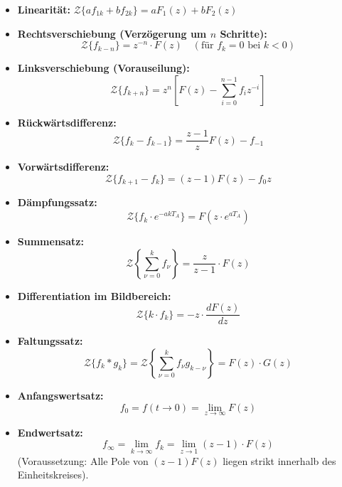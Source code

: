 \begin{tcolorbox}
\small
\begin{itemize}
  \item \textbf{Linearität:} $\mathcal{Z}\{a f_{1k} + b f_{2k}\} = a F_1(z) + b F_2(z)$
  \item \textbf{Rechtsverschiebung (Verzögerung um $n$ Schritte):}
  \[
  \mathcal{Z}\{f_{k-n}\} = z^{-n} \cdot F(z) \quad (\text{für } f_k = 0 \text{ bei } k < 0)
  \]
  \item \textbf{Linksverschiebung (Vorauseilung):}
  \[
  \mathcal{Z}\{f_{k+n}\} = z^n \left[ F(z) - \sum_{i=0}^{n-1} f_i z^{-i} \right]
  \]
  \item \textbf{Rückwärtsdifferenz:}
  \[
  \mathcal{Z}\{f_k - f_{k-1}\} = \frac{z-1}{z} F(z) - f_{-1}
  \]
  \item \textbf{Vorwärtsdifferenz:}
  \[
  \mathcal{Z}\{f_{k+1} - f_k\} = (z-1) F(z) - f_0 z
  \]
  \item \textbf{Dämpfungssatz:}
  \[
  \mathcal{Z}\{f_k \cdot e^{-a k T_A}\} = F(z \cdot e^{a T_A})
  \]
  \item \textbf{Summensatz:}
  \[
  \mathcal{Z}\left\{ \sum_{\nu=0}^k f_\nu \right\} = \frac{z}{z-1} \cdot F(z)
  \]
  \item \textbf{Differentiation im Bildbereich:}
  \[
  \mathcal{Z}\{k \cdot f_k\} = -z \cdot \frac{d F(z)}{dz}
  \]
  \item \textbf{Faltungssatz:}
  \[
  \mathcal{Z}\{f_k * g_k\} = \mathcal{Z}\left\{ \sum_{\nu=0}^k f_\nu g_{k-\nu} \right\} = F(z) \cdot G(z)
  \]
  \item \textbf{Anfangswertsatz:}
  \[
  f_0 = f(t \to 0) = \lim_{z \to \infty} F(z)
  \]
  \item \textbf{Endwertsatz:}
  \[
  f_\infty = \lim_{k \to \infty} f_k = \lim_{z \to 1} (z - 1) \cdot F(z)
  \]
  (Voraussetzung: Alle Pole von $(z-1)F(z)$ liegen strikt innerhalb des Einheitskreises).
\end{itemize}
\end{tcolorbox}


